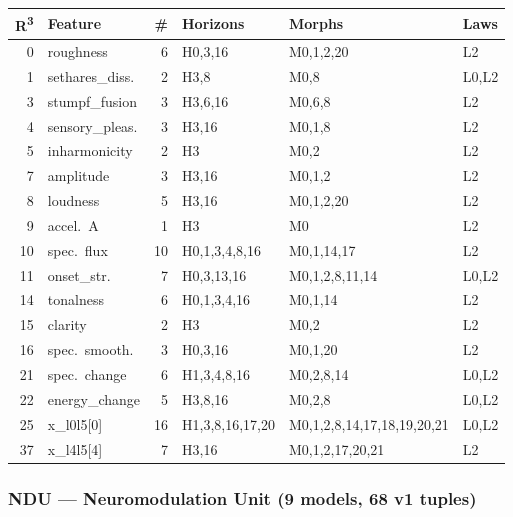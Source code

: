 {\footnotesize
\begin{longtable}{@{}r l r l l l@{}}
\toprule
\textbf{R\textsuperscript{3}} & \textbf{Feature} & \textbf{\#}
  & \textbf{Horizons} & \textbf{Morphs} & \textbf{Laws} \\
\midrule
\endfirsthead
\midrule
\endhead
\endfoot
\bottomrule
\endlastfoot

\rowcolor{grpA}
0 & roughness & 6 & H0,3,16 & M0,1,2,20 & L2 \\
\rowcolor{grpA}
1 & sethares\_diss. & 2 & H3,8 & M0,8 & L0,L2 \\
\rowcolor{grpA}
3 & stumpf\_fusion & 3 & H3,6,16 & M0,6,8 & L2 \\
\rowcolor{grpA}
4 & sensory\_pleas. & 3 & H3,16 & M0,1,8 & L2 \\
\rowcolor{grpA}
5 & inharmonicity & 2 & H3 & M0,2 & L2 \\
\rowcolor{grpB}
7 & amplitude & 3 & H3,16 & M0,1,2 & L2 \\
\rowcolor{grpB}
8 & loudness & 5 & H3,16 & M0,1,2,20 & L2 \\
\rowcolor{grpB}
9 & accel.~A & 1 & H3 & M0 & L2 \\
\rowcolor{grpB}
10 & spec.~flux & 10 & H0,1,3,4,8,16 & M0,1,14,17 & L2 \\
\rowcolor{grpB}
11 & onset\_str. & 7 & H0,3,13,16 & M0,1,2,8,11,14 & L0,L2 \\
\rowcolor{grpC}
14 & tonalness & 6 & H0,1,3,4,16 & M0,1,14 & L2 \\
\rowcolor{grpC}
15 & clarity & 2 & H3 & M0,2 & L2 \\
\rowcolor{grpC}
16 & spec.~smooth. & 3 & H0,3,16 & M0,1,20 & L2 \\
\rowcolor{grpD}
21 & spec.~change & 6 & H1,3,4,8,16 & M0,2,8,14 & L0,L2 \\
\rowcolor{grpD}
22 & energy\_change & 5 & H3,8,16 & M0,2,8 & L0,L2 \\
\rowcolor{grpE}
25 & x\_l0l5[0] & 16 & H1,3,8,16,17,20 & M0,1,2,8,14,17,18,19,20,21 & L0,L2 \\
\rowcolor{grpE}
37 & x\_l4l5[4] & 7 & H3,16 & M0,1,2,17,20,21 & L2 \\
\end{longtable}
}


\subsubsection*{NDU --- Neuromodulation Unit (9 models, 68 v1 tuples)}

